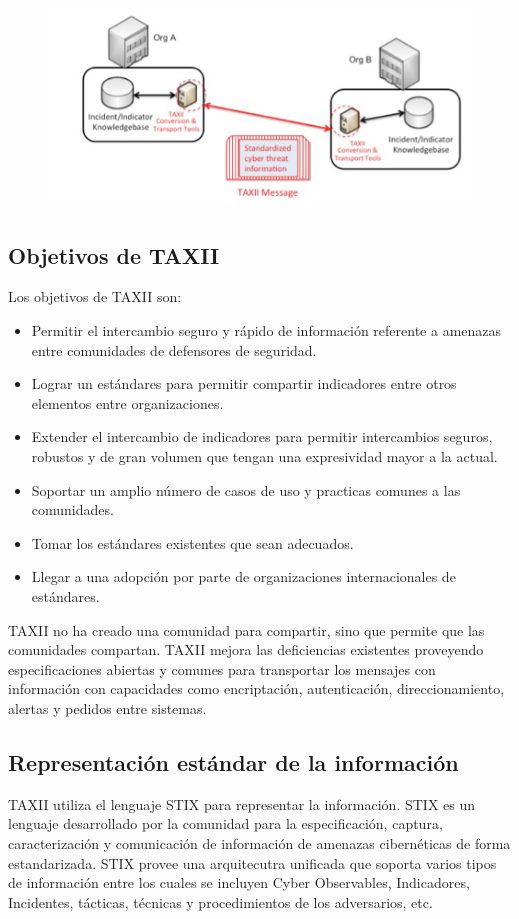 \begin{figure}[ht!]
  \centering
    \includegraphics[width=150mm]{./Figures/TAXIIArchitecture1.png}
\end{figure}

 
 \subsection{Objetivos de TAXII}
 Los objetivos de TAXII son:
 \begin{itemize}
   \item Permitir el intercambio seguro y rápido de información referente a 
   amenazas entre comunidades de defensores de seguridad.
   \item Lograr un estándares para permitir compartir indicadores entre otros 
   elementos entre organizaciones.
   \item Extender el intercambio de indicadores para permitir intercambios 
   seguros, robustos y de gran volumen que tengan una expresividad mayor a la 
   actual.
   \item Soportar un amplio número de casos de uso y practicas comunes a las 
   comunidades.
   \item Tomar los estándares existentes que sean adecuados.
   \item Llegar a una adopción por parte de organizaciones internacionales de 
   estándares.
 \end{itemize}
 
 TAXII no ha creado una comunidad para compartir, sino que permite que las 
 comunidades compartan. TAXII mejora las deficiencias existentes proveyendo 
 especificaciones abiertas y comunes para transportar los mensajes con 
 información con capacidades como encriptación, autenticación, 
 direccionamiento, alertas y pedidos entre sistemas.
  
  \subsection{Representación estándar de la información}
TAXII utiliza el lenguaje STIX para representar la información. STIX es un 
lenguaje desarrollado por la comunidad para la especificación, captura, 
caracterización y comunicación de información de amenazas cibernéticas de forma 
estandarizada. STIX provee una arquitecutra unificada que soporta varios tipos 
de información entre los cuales se incluyen Cyber Observables, Indicadores, 
Incidentes, tácticas, técnicas y procedimientos de los adversarios, etc.

